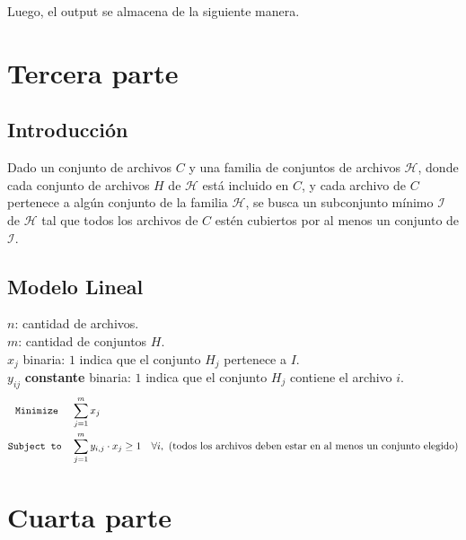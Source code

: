 \documentclass[11pt, a4paper, pdftex]{article}
\begin{document}
Luego, el output se almacena de la siguiente manera.



\section{Tercera parte}

\subsection{Introducción}

Dado un conjunto de archivos $C$ y una familia de conjuntos de archivos \( \mathcal{H} \), donde cada conjunto de archivos $H$ de \( \mathcal{H} \) está incluido en $C$, y cada archivo de $C$ pertenece a algún conjunto de la familia \( \mathcal{H} \), se busca un subconjunto mínimo \( \mathcal{I} \) de \( \mathcal{H} \) tal que todos los archivos de $C$ estén cubiertos por al menos un conjunto de \( \mathcal{I} \).

\subsection{Modelo Lineal}

$n$: cantidad de archivos. \\

$m$: cantidad de conjuntos \( H \). \\

$x_{j}$ binaria: $1$ indica que el conjunto $H_{j}$ pertenece a $I$. \\ 

$y_{ij}$ \textbf{constante} binaria: $1$ indica que el conjunto $H_{j}$
contiene el archivo $i$. \\ 

\begin{alignat*}{2}
    \texttt{Minimize}\quad\,\, & \sum_{j = 1}^{m} x_{j}\\
    \texttt{Subject to}\quad   & \sum_{j=1}^{m} y_{i,j} \cdot x_j \geq 1 \quad \forall i,\ \text{(todos los archivos deben estar en al menos un conjunto elegido)}\\
\end{alignat*}

\section{Cuarta parte}
\end{document}

